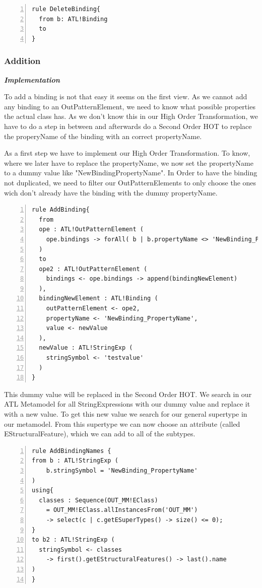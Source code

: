 \documentclass{llncs}
\begin{document}
\begin{lstlisting}[language=ATL, numbers=left,xleftmargin=5.0ex, caption=Definition of Delete-Binding., label=lst:delete]
rule DeleteBinding{
  from b: ATL!Binding
  to
}
\end{lstlisting}

\subsubsection{Addition}

\textbf\textit{{Implementation}}

To add a binding is not that easy it seems on the first view.
As we cannot add any binding to an OutPatternElement, we need to know what possible properties the actual class has.
As we don't know this in our High Order Transformation, we have to do a step in between and afterwards do a Second Order HOT to replace the properyName of the binding with an correct propertyName.

As a first step we have to implement our High Order Transformation. To know, where we later have to replace the propertyName, we now set the propertyName to a dummy value like "NewBindingPropertyName".
In Order to have the binding not duplicated, we need to filter our OutPatternElements to only choose the ones wich don't already have the binding with the dummy propertyName.

\begin{lstlisting}[language=ATL, numbers=left,xleftmargin=5.0ex, caption=AddBinding-Definition, label=lst:addbinding]
rule AddBinding{
  from 
  ope : ATL!OutPatternElement ( 
    ope.bindings -> forAll( b | b.propertyName <> 'NewBinding_PropertyName')
  )
  to
  ope2 : ATL!OutPatternElement (
    bindings <- ope.bindings -> append(bindingNewElement)
  ), 
  bindingNewElement : ATL!Binding (
    outPatternElement <- ope2,
    propertyName <- 'NewBinding_PropertyName',
    value <- newValue	
  ),
  newValue : ATL!StringExp (
    stringSymbol <- 'testvalue'
  )	
}
\end{lstlisting}

This dummy value will be replaced in the Second Order HOT.
We search in our ATL Metamodel for all StringExpressions with our dummy value and replace it with a new value.
To get this new value we search for our general supertype in our metamodel. From this supertype we can now choose an attribute (called EStructuralFeature), which we can add to all of the subtypes.

\begin{lstlisting}[language=ATL, numbers=left,xleftmargin=5.0ex, caption=AddBindingNames-Definition., label=lst:addbindingnames]
rule AddBindingNames {
from b : ATL!StringExp (
    b.stringSymbol = 'NewBinding_PropertyName'
)
using{
  classes : Sequence(OUT_MM!EClass) 
	= OUT_MM!EClass.allInstancesFrom('OUT_MM') 
	-> select(c | c.getESuperTypes() -> size() <= 0);
}
to b2 : ATL!StringExp ( 
  stringSymbol <- classes 
	-> first().getEStructuralFeatures() -> last().name
)	
}
\end{lstlisting}
\end{document}
